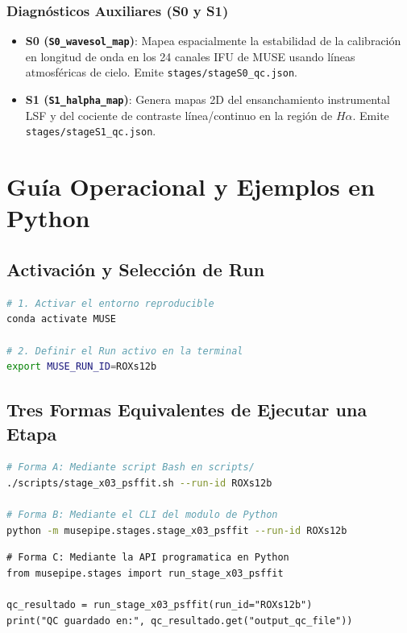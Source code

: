 \documentclass[11pt,a4paper]{article}
\begin{document}
\subsubsection{Diagnósticos Auxiliares (S0 y S1)}
\begin{itemize}[leftmargin=1.0cm]
    \item \textbf{S0 (\texttt{S0\_wavesol\_map})}: Mapea espacialmente la estabilidad de la calibración en longitud de onda en los 24 canales IFU de MUSE usando líneas atmosféricas de cielo. Emite \texttt{stages/stageS0\_qc.json}.
    \item \textbf{S1 (\texttt{S1\_halpha\_map})}: Genera mapas 2D del ensanchamiento instrumental LSF y del cociente de contraste línea/continuo en la región de $H\alpha$. Emite \texttt{stages/stageS1\_qc.json}.
\end{itemize}

\section{Guía Operacional y Ejemplos en Python}

\subsection{Activación y Selección de Run}
\begin{lstlisting}[language=bash]
# 1. Activar el entorno reproducible
conda activate MUSE

# 2. Definir el Run activo en la terminal
export MUSE_RUN_ID=ROXs12b
\end{lstlisting}

\subsection{Tres Formas Equivalentes de Ejecutar una Etapa}
\begin{lstlisting}[language=bash]
# Forma A: Mediante script Bash en scripts/
./scripts/stage_x03_psffit.sh --run-id ROXs12b

# Forma B: Mediante el CLI del modulo de Python
python -m musepipe.stages.stage_x03_psffit --run-id ROXs12b
\end{lstlisting}

\begin{lstlisting}
# Forma C: Mediante la API programatica en Python
from musepipe.stages import run_stage_x03_psffit

qc_resultado = run_stage_x03_psffit(run_id="ROXs12b")
print("QC guardado en:", qc_resultado.get("output_qc_file"))
\end{lstlisting}
\end{document}

